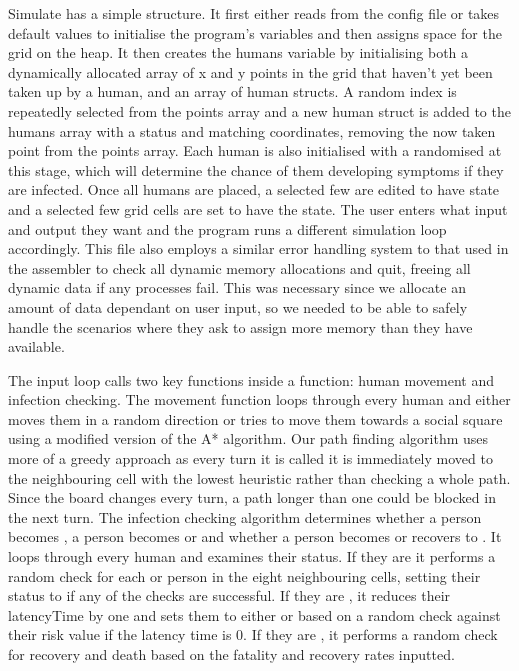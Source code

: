 \documentclass[11pt]{article}
\begin{document}
\par Simulate has a simple structure. It first either reads from the config file or takes default values to initialise the program's variables and then assigns space for the grid on the heap. 
It then creates the humans variable by initialising both a dynamically allocated array of x and y points in the grid that haven't yet been taken up by a human, and an array of human structs. 
A random index is repeatedly selected from the points array and a new human struct is added  to the humans array with a  status and matching coordinates, removing the now taken point from the points array. 
Each human is also initialised with a randomised  at this stage, which will determine the chance of them developing symptoms if they are infected. 
Once all humans are placed, a selected few are edited to have  state and a selected few grid cells are set to have the  state. 
The user enters what input and output they want and the program runs a different simulation loop accordingly. This file also employs a similar error handling system to that used in the assembler to check all dynamic memory allocations and quit, freeing all dynamic data if any processes fail. 
This was necessary since we allocate an amount of data dependant on user input, so we needed to be able to safely handle the scenarios where they ask to assign more memory than they have available.

\par The input loop calls two key functions inside a  function: human movement and infection checking. 
The movement function loops through every human and either moves them in a random direction or tries to move them towards a social square using a modified version of the A* algorithm. 
Our path finding algorithm uses more of a greedy approach as every turn it is called it is immediately moved to the neighbouring cell with the lowest heuristic rather than checking a whole path. 
Since the board changes every turn, a path longer than one could be blocked in the next turn. The infection checking algorithm determines whether a  person becomes , a  person becomes  or  and whether a  person becomes  or recovers to . 
It loops through every human and examines their status. If they are  it performs a random check for each  or  person in the eight neighbouring cells, setting their status to  if any of the checks are successful. 
If they are , it reduces their latencyTime by one and sets them to either  or  based on a random check against their risk value if the latency time is 0. 
If they are , it performs a random check for recovery and death based on the fatality and recovery rates inputted.
\end{document}
